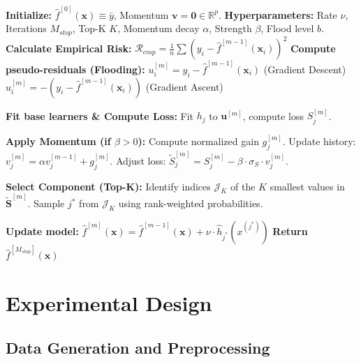 \documentclass[fontsize=12 pt]{scrartcl}
\begin{document}
\begin{algorithm}
\caption{Advanced CWB with Top-K, Momentum, and Flooding}
\label{alg:adv_cwb}
\begin{algorithmic}[1]
\State \textbf{Initialize:} $\hat{f}^{[0]}(\mathbf{x}) \equiv \bar{y}$, Momentum $\mathbf{v} = \mathbf{0} \in \mathbb{R}^p$.
\State \textbf{Hyperparameters:} Rate $\nu$, Iterations $M_{stop}$, Top-K $K$, Momentum decay $\alpha$, Strength $\beta$, Flood level $b$.
    \State \textbf{Calculate Empirical Risk:} $\mathcal{R}_{emp} = \frac{1}{n}\sum (y_i - \hat{f}^{[m-1]}(\mathbf{x}_i))^2$
    \State \textbf{Compute pseudo-residuals (Flooding):} 
        \State $u_i^{[m]} = y_i - \hat{f}^{[m-1]}(\mathbf{x}_i)$ \quad (Gradient Descent)
    \Else
        \State $u_i^{[m]} = -(y_i - \hat{f}^{[m-1]}(\mathbf{x}_i))$ \quad (Gradient Ascent)
    \EndIf
    
    \State \textbf{Fit base learners \& Compute Loss:}
        \State Fit $h_j$ to $\mathbf{u}^{[m]}$, compute loss $S_j^{[m]}$.
    \EndFor
    
    \State \textbf{Apply Momentum (if $\beta > 0$):}
        \State Compute normalized gain $g_j^{[m]}$.
        \State Update history: $v_j^{[m]} = \alpha v_j^{[m-1]} + g_j^{[m]}$.
        \State Adjust loss: $\tilde{S}_j^{[m]} = S_j^{[m]} - \beta \cdot \sigma_S \cdot v_j^{[m]}$.
    \EndFor
    
    \State \textbf{Select Component (Top-K):}
    \State Identify indices $\mathcal{J}_K$ of the $K$ smallest values in $\tilde{\mathbf{S}}^{[m]}$.
    \State Sample $j^*$ from $\mathcal{J}_K$ using rank-weighted probabilities.
    
    \State \textbf{Update model:}
    \State $\hat{f}^{[m]}(\mathbf{x}) = \hat{f}^{[m-1]}(\mathbf{x}) + \nu \cdot \hat{h}_{j^*}(x^{(j^*)})$
\EndFor
\State \textbf{Return} $\hat{f}^{[M_{stop}]}(\mathbf{x})$
\end{algorithmic}
\end{algorithm}








\newpage
\section{Experimental Design}

\subsection{Data Generation and Preprocessing}
\end{document}
